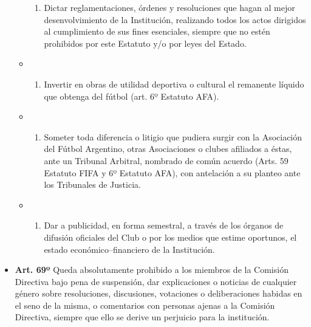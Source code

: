 \documentclass[]{book}
\providecommand{\tightlist}{%
  \setlength{\itemsep}{0pt}\setlength{\parskip}{0pt}}
\begin{document}
\begin{itemize}
\begin{itemize}
\begin{enumerate}
    \item
      Dictar reglamentaciones, órdenes y resoluciones que hagan al mejor
      desenvolvimiento de la Institución, realizando todos los actos
      dirigidos al cumplimiento de sus fines esenciales, siempre que no
      estén prohibidos por este Estatuto y/o por leyes del Estado.
    \end{enumerate}
  \item
    \begin{enumerate}
    \def\labelenumi{\alph{enumi})}
    \setcounter{enumi}{22}
    \tightlist
    \item
      Invertir en obras de utilidad deportiva o cultural el remanente
      líquido que obtenga del fútbol (art. 6º Estatuto AFA).
    \end{enumerate}
  \item
    \begin{enumerate}
    \def\labelenumi{\alph{enumi})}
    \setcounter{enumi}{23}
    \tightlist
    \item
      Someter toda diferencia o litigio que pudiera surgir con la
      Asociación del Fútbol Argentino, otras Asociaciones o clubes
      afiliados a éstas, ante un Tribunal Arbitral, nombrado de común
      acuerdo (Arts. 59 Estatuto FIFA y 6º Estatuto AFA), con antelación
      a su planteo ante los Tribunales de Justicia.
    \end{enumerate}
  \item
    \begin{enumerate}
    \def\labelenumi{\alph{enumi})}
    \setcounter{enumi}{24}
    \tightlist
    \item
      Dar a publicidad, en forma semestral, a través de los órganos de
      difusión oficiales del Club o por los medios que estime oportunos,
      el estado económico--financiero de la Institución.
    \end{enumerate}
  \end{itemize}
\end{itemize}

\begin{itemize}
\tightlist
\item
  \textbf{Art. 69º} Queda absolutamente prohibido a los miembros de la
  Comisión Directiva bajo pena de suspensión, dar explicaciones o
  noticias de cualquier género sobre resoluciones, discusiones,
  votaciones o deliberaciones habidas en el seno de la misma, o
  comentarios con personas ajenas a la Comisión Directiva, siempre que
  ello se derive un perjuicio para la institución.
\end{itemize}
\end{document}
